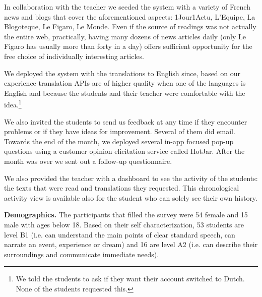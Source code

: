 In collaboration with the teacher we seeded the system with a variety of French news and blogs that cover the aforementioned aspects: 1Jour1Actu, L'Equipe, La Blogoteque, Le Figaro, Le Monde. 
% 
	Even if the source of readings was not actually the entire web, practically, having many dozens of news articles daily (only Le Figaro has usually more than forty in a day) offers sufficient opportunity for the free choice of individually interesting articles. 
	



We deployed the system with the translations to English since, based on our experience translation APIs are of higher quality when one of the languages is English and because the students and their teacher were comfortable with the idea.\footnote{We told the students to ask if they want their account switched to Dutch. None of the students requested this.}

We also invited the students to send us feedback at any time if they encounter problems or if they have ideas for improvement. Several of them did email. Towards the end of the month, we deployed several in-app focused pop-up questions using a customer opinion elicitation service called HotJar. After the month was over we sent out a follow-up questionnaire.



We also provided the teacher with a dashboard to see the activity of the students: the texts that were read and translations they requested. This chronological activity view is available also for the student who can solely see their own history.







{\bf Demographics.} 
The participants that filled the survey were 54 female and 15 male with ages below 18. Based on their self characterization, 53 students are level B1 (i.e. can understand the main points of clear standard speech, can narrate an event, experience or dream) and 16 are level A2 (i.e. can describe their surroundings and communicate immediate needs). 

